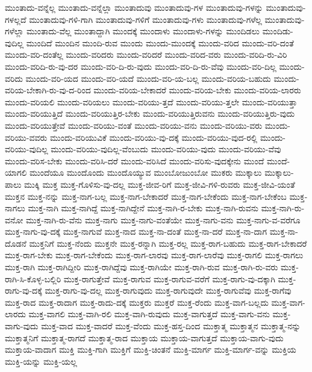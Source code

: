 {ಮುಂತಾದು-ವನ್ನೆಲ್ಲ
ಮುಂತಾದು-ವನ್ನೆಲ್ಲಾ
ಮುಂತಾದುವು
ಮುಂತಾದುವು-ಗಳ
ಮುಂತಾದುವು-ಗಳನ್ನು
ಮುಂತಾದುವು-ಗಳಲ್ಲದೆ
ಮುಂತಾದುವು-ಗಳಿ-ಗಾಗಿ
ಮುಂತಾದುವು-ಗಳಿಗೆ
ಮುಂತಾದುವು-ಗಳು
ಮುಂತಾದುವು-ಗಳೆಲ್ಲ
ಮುಂತಾದುವು-ಗಳೆಲ್ಲಾ
ಮುಂತಾದು-ವೆಲ್ಲ
ಮುಂತಾದ್ದಾಗಿ
ಮುಂದಕ್ಕೆ
ಮುಂದಾಳು
ಮುಂದಾಳು-ಗಳನ್ನು
ಮುಂದಿಡಲು
ಮುಂದಿಡು-ವುದಿಲ್ಲ
ಮುಂದಿದೆ
ಮುಂದಿನ
ಮುಂದಿ-ರುವ
ಮುಂದು
ಮುಂದು-ಮುಂದಕ್ಕೆ
ಮುಂದು-ವರಿದ
ಮುಂದು-ವರಿ-ದಂತೆ
ಮುಂದು-ವರಿ-ದಂತೆಲ್ಲ
ಮುಂದು-ವರಿದರು
ಮುಂದು-ವರಿದರೆ
ಮುಂದು-ವರಿದ-ವರು
ಮುಂದು-ವರಿದಿ-ರು-ವಿರಿ
ಮುಂದು-ವರಿದಿ-ರು-ವು-ದರ
ಮುಂದು-ವರಿ-ದಿ-ರು-ವುದು
ಮುಂದು-ವರಿ-ದಿ-ರು-ವೆವು
ಮುಂದು-ವರಿ-ದಿಲ್ಲ
ಮುಂದು-ವರಿದು
ಮುಂದು-ವರಿ-ಯದ
ಮುಂದು-ವರಿ-ಯದೆ
ಮುಂದು-ವರಿ-ಯ-ಬಲ್ಲ
ಮುಂದು-ವರಿಯ-ಬಹುದು
ಮುಂದು-ವರಿಯ-ಬೇಕಾಗಿ-ರು-ವು-ದ-ರಿಂದ
ಮುಂದು-ವರಿಯ-ಬೇಕಾದರೆ
ಮುಂದು-ವರಿಯ-ಬೇಕು
ಮುಂದು-ವರಿಯ-ಲಾರರು
ಮುಂದು-ವರಿಯಲಿ
ಮುಂದು-ವರಿಯಲು
ಮುಂದು-ವರಿಯು-ತ್ತದೆ
ಮುಂದು-ವರಿಯು-ತ್ತಲೇ
ಮುಂದು-ವರಿಯುತ್ತಾ
ಮುಂದು-ವರಿಯುತ್ತಿದೆ
ಮುಂದು-ವರಿಯುತ್ತಿರ-ಬೇಕು
ಮುಂದು-ವರಿಯುತ್ತಿರುವನು
ಮುಂದು-ವರಿಯುತ್ತಿರು-ವುದು
ಮುಂದು-ವರಿಯುತ್ತೇವೆ
ಮುಂದು-ವರಿಯು-ವಂತೆ
ಮುಂದು-ವರಿಯು-ವನು
ಮುಂದು-ವರಿಯು-ವರು
ಮುಂದು-ವರಿಯು-ವವರು
ಮುಂದು-ವರಿಯುವಿಕೆ
ಮುಂದು-ವರಿಯು-ವು-ದಕ್ಕೆ
ಮುಂದು-ವರಿಯು-ವುದ-ರಲ್ಲಿ
ಮುಂದು-ವರಿಯು-ವುದಿಲ್ಲ
ಮುಂದು-ವರಿಯು-ವುದಿಲ್ಲ-ವೆಂಬುದು
ಮುಂದು-ವರಿಯು-ವುದು
ಮುಂದು-ವರಿಯು-ವೆವು
ಮುಂದು-ವರಿಸ-ಬೇಕು
ಮುಂದು-ವರಿಸಿ-ದರೆ
ಮುಂದು-ವರಿಸಿದೆ
ಮುಂದು-ವರಿಸು-ವುದಕ್ಕೇನು
ಮುಂದೆ
ಮುಂದೆ-ಯಾಗಲಿ
ಮುಂದೆಯೂ
ಮುಂದೊಂದು
ಮುಂದೊಯ್ಯುವ
ಮುಂಬೋಜುಂಬೋ
ಮುಕರು
ಮುಕ್ಕಾಲು
ಮುಕ್ಕಾಲು-ಪಾಲು
ಮುಕ್ಕಿ
ಮುಕ್ತ
ಮುಕ್ತ-ಗೊಳಿಸು-ವು-ದಲ್ಲ
ಮುಕ್ತ-ಜೀವ-ರಿಗೆ
ಮುಕ್ತ-ಜೀವಿ-ಗಳಿ-ರುವರು
ಮುಕ್ತ-ಜೀವಿ-ಯಂತೆ
ಮುಕ್ತನ
ಮುಕ್ತ-ನನ್ನು
ಮುಕ್ತ-ನಾಗ-ಬಲ್ಲ
ಮುಕ್ತ-ನಾಗ-ಬೇಕಾದರೆ
ಮುಕ್ತ-ನಾಗ-ಬೇಕೆಂದು
ಮುಕ್ತ-ನಾಗ-ಬೇಕೆಂಬ
ಮುಕ್ತ-ನಾಗಲು
ಮುಕ್ತ-ನಾಗಿ
ಮುಕ್ತ-ನಾಗಿದ್ದೆ
ಮುಕ್ತ-ನಾಗಿದ್ದೇನೆ
ಮುಕ್ತ-ನಾಗಿ-ರ-ಬೇಕು
ಮುಕ್ತ-ನಾಗಿ-ರುವನು
ಮುಕ್ತ-ನಾಗಿ-ರು-ವನೋ
ಮುಕ್ತ-ನಾಗಿ-ರು-ವೆನು
ಮುಕ್ತ-ನಾಗು
ಮುಕ್ತ-ನಾಗು-ವಂತೆಯೇ
ಮುಕ್ತ-ನಾಗು-ವನು
ಮುಕ್ತ-ನಾಗು-ವ-ವರೆಗೂ
ಮುಕ್ತ-ನಾಗು-ವು-ದಕ್ಕೆ
ಮುಕ್ತ-ನಾಗುವೆ
ಮುಕ್ತ-ನಾದ
ಮುಕ್ತ-ನಾ-ದಂತೆ
ಮುಕ್ತ-ನಾ-ದರೆ
ಮುಕ್ತ-ನಾ-ದಾಗ
ಮುಕ್ತ-ನಾ-ದೊಡನೆ
ಮುಕ್ತನಿಗೆ
ಮುಕ್ತ-ನೆಂದು
ಮುಕ್ತನೇ
ಮುಕ್ತ-ರನ್ನಾಗಿ
ಮುಕ್ತ-ರಲ್ಲ
ಮುಕ್ತ-ರಾಗ-ಬಹುದು
ಮುಕ್ತ-ರಾಗ-ಬೇಕಾದರೆ
ಮುಕ್ತ-ರಾಗ-ಬೇಕು
ಮುಕ್ತ-ರಾಗ-ಬೇಕೆಂದು
ಮುಕ್ತ-ರಾಗ-ಲಾರವು
ಮುಕ್ತ-ರಾಗ-ಲಾರೆವು
ಮುಕ್ತ-ರಾಗಲಿ
ಮುಕ್ತ-ರಾಗಲು
ಮುಕ್ತ-ರಾಗಿ
ಮುಕ್ತ-ರಾಗಿದ್ದೀರಿ
ಮುಕ್ತ-ರಾಗಿದ್ದೆವು
ಮುಕ್ತ-ರಾಗಿಯೇ
ಮುಕ್ತ-ರಾಗಿ-ರುವ
ಮುಕ್ತ-ರಾಗಿ-ರು-ವರು
ಮುಕ್ತ-ರಾಗಿ-ಸಿ-ಕೊಳ್ಳ-ಬಲ್ಲಿರಿ
ಮುಕ್ತ-ರಾಗುತ್ತೇವೆ
ಮುಕ್ತ-ರಾಗುವ
ಮುಕ್ತ-ರಾಗುವ-ವರೆಗೆ
ಮುಕ್ತ-ರಾಗು-ವು-ದಕ್ಕಾಗಿ
ಮುಕ್ತ-ರಾಗು-ವು-ದಕ್ಕೆ
ಮುಕ್ತ-ರಾಗು-ವು-ದಲ್ಲ
ಮುಕ್ತ-ರಾಗುವುದು
ಮುಕ್ತ-ರಾಗುವುದೇ
ಮುಕ್ತ-ರಾಗುವೆವು
ಮುಕ್ತ-ರಾಗೆವು
ಮುಕ್ತ-ರಾದ
ಮುಕ್ತ-ರಾದಾಗ
ಮುಕ್ತ-ರಾದು-ದಕ್ಕೆ
ಮುಕ್ತರು
ಮುಕ್ತರೆ
ಮುಕ್ತ-ರೆಂದು
ಮುಕ್ತ-ವಾಗ-ಬಲ್ಲದು
ಮುಕ್ತ-ವಾಗ-ಲಾರದು
ಮುಕ್ತ-ವಾಗಲಿ
ಮುಕ್ತ-ವಾಗಿ-ರಲಿ
ಮುಕ್ತ-ವಾಗಿ-ರುವುದು
ಮುಕ್ತ-ವಾಗುತ್ತದೆ
ಮುಕ್ತ-ವಾಗು-ವನು
ಮುಕ್ತ-ವಾಗು-ವುದು
ಮುಕ್ತ-ವಾದ
ಮುಕ್ತ-ವಾದರೆ
ಮುಕ್ತ-ವೆಂದು
ಮುಕ್ತ-ಹಸ್ತ-ದಿಂದ
ಮುಕ್ತಾತ್ಮ
ಮುಕ್ತಾತ್ಮನ
ಮುಕ್ತಾತ್ಮ-ನನ್ನು
ಮುಕ್ತಾತ್ಮನಿಗೆ
ಮುಕ್ತಾತ್ಮ-ರಾಗದೆ
ಮುಕ್ತಾತ್ಮ-ರಾದ
ಮುಕ್ತಾಯ
ಮುಕ್ತಾಯ-ವಾಗುತ್ತದೆ
ಮುಕ್ತಾಯ-ವಾಗು-ವುದು
ಮುಕ್ತಾಯ-ವಾದಾಗ
ಮುಕ್ತಿ
ಮುಕ್ತಿ-ಗಾಗಿ
ಮುಕ್ತಿಗೆ
ಮುಕ್ತಿ-ಚಿಂತನೆ
ಮುಕ್ತಿ-ಮಾರ್ಗ
ಮುಕ್ತಿ-ಮಾರ್ಗ-ವನ್ನು
ಮುಕ್ತಿಯ
ಮುಕ್ತಿ-ಯನ್ನು
ಮುಕ್ತಿ-ಯಲ್ಲ
}
